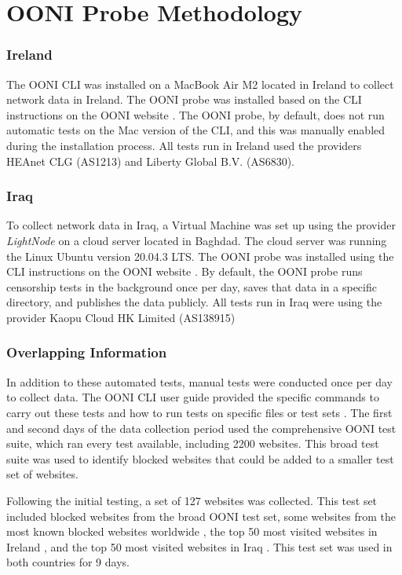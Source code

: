 \section{OONI Probe Methodology}

\subsubsection{Ireland}

The OONI CLI was installed on a MacBook Air M2 located in Ireland to collect network data in Ireland. The OONI probe was installed based on the CLI instructions on the OONI website \cite{OONISCLI}. The OONI probe, by default, does not run automatic tests on the Mac version of the CLI, and this was manually enabled during the installation process. All tests run in Ireland used the providers HEAnet CLG (AS1213) and Liberty Global B.V. (AS6830).

\subsubsection{Iraq}

To collect network data in Iraq, a Virtual Machine was set up using the provider \textit{LightNode} \cite{lightnodeLightNodeGlobal} on a cloud server located in Baghdad. The cloud server was running the Linux Ubuntu version 20.04.3 LTS. The OONI probe was installed using the CLI instructions on the OONI website \cite{OONISCLI}. By default, the OONI probe runs censorship tests in the background once per day, saves that data in a specific directory, and publishes the data publicly. All tests run in Iraq were using the provider Kaopu Cloud HK Limited (AS138915)

\subsubsection{Overlapping Information}

In addition to these automated tests, manual tests were conducted once per day to collect data. The OONI CLI user guide provided the specific commands to carry out these tests and how to run tests on specific files or test sets \cite{ooniUserGuideCLI}. The first and second days of the data collection period used the comprehensive OONI test suite, which ran every test available, including 2200 websites. This broad test suite was used to identify blocked websites that could be added to a smaller test set of websites.

Following the initial testing, a set of 127 websites was collected. This test set included blocked websites from the broad OONI test set, some websites from the most known blocked websites worldwide \cite{blocksiteMostBlocked}, the top 50 most visited websites in Ireland \cite{top50irishwebsites}, and the top 50 most visited websites in Iraq \cite{top50IraqWebsites}. This test set was used in both countries for 9 days.

